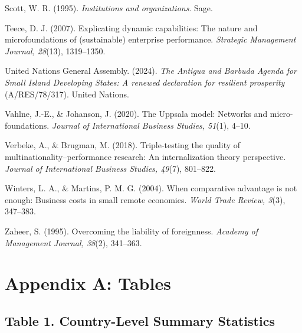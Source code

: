 \documentclass[
  12pt]{article}
\begin{document}
Scott, W. R. (1995). \emph{Institutions and organizations}. Sage.

Teece, D. J. (2007). Explicating dynamic capabilities: The nature and
microfoundations of (sustainable) enterprise performance.
\emph{Strategic Management Journal, 28}(13), 1319--1350.

United Nations General Assembly. (2024). \emph{The Antigua and Barbuda
Agenda for Small Island Developing States: A renewed declaration for
resilient prosperity} (A/RES/78/317). United Nations.

Vahlne, J.-E., \& Johanson, J. (2020). The Uppsala model: Networks and
micro-foundations. \emph{Journal of International Business Studies,
51}(1), 4--10.

Verbeke, A., \& Brugman, M. (2018). Triple-testing the quality of
multinationality--performance research: An internalization theory
perspective. \emph{Journal of International Business Studies, 49}(7),
801--822.

Winters, L. A., \& Martins, P. M. G. (2004). When comparative advantage
is not enough: Business costs in small remote economies. \emph{World
Trade Review, 3}(3), 347--383.

Zaheer, S. (1995). Overcoming the liability of foreignness.
\emph{Academy of Management Journal, 38}(2), 341--363.

\hypertarget{appendix-a-tables}{%
\section{Appendix A: Tables}\label{appendix-a-tables}}

\hypertarget{table-1.-country-level-summary-statistics}{%
\subsection{Table 1. Country-Level Summary
Statistics}\label{table-1.-country-level-summary-statistics}}
\end{document}
